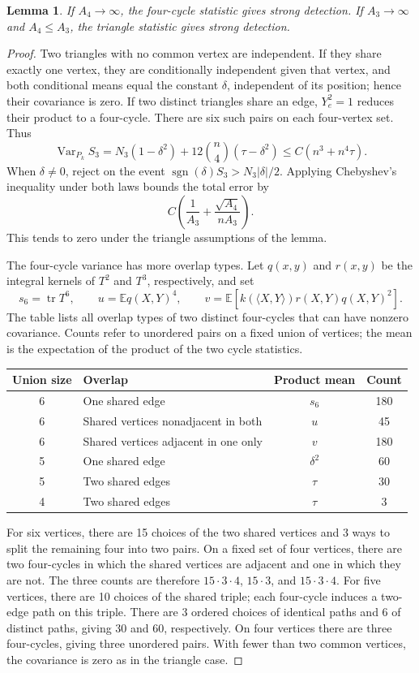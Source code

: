 \documentclass[11pt,reqno]{amsart}
\numberwithin{equation}{section}
\newtheorem{lemma}[theorem]{Lemma}
\theoremstyle{definition}
\theoremstyle{remark}
\theoremstyle{definition}
\DeclareMathOperator{\tr}{tr}
\DeclareMathOperator{\Var}{Var}
\begin{document}
\begin{lemma}\label{lem:cycle-detection}
If $A_4\to\infty$, the four-cycle statistic gives strong detection.
If $A_3\to\infty$ and $A_4\le A_3$, the triangle statistic gives strong detection.
\end{lemma}
\begin{proof}
Two triangles with no common vertex are independent. If they share exactly one vertex, they are conditionally independent given that vertex,
and both conditional means equal the constant $\delta$, independent of its position; hence their covariance is zero.
If two distinct triangles share an edge, $Y_e^2=1$ reduces their product to a four-cycle.
There are six such pairs on each four-vertex set. Thus
\begin{equation}\label{eq:triangle-var}
 \Var_{P_k}S_3=N_3(1-\delta^2)
       +12\binom n4(\tau-\delta^2)
 \le C(n^3+n^4\tau).
\end{equation}
When $\delta\ne0$, reject on the event
$\operatorname{sgn}(\delta)S_3>N_3|\delta|/2$.
Applying Chebyshev's inequality under both laws bounds the total error by
\[
 C\left(\frac1{A_3}+\frac{\sqrt{A_4}}{nA_3}\right).
\]
This tends to zero under the triangle assumptions of the lemma.

The four-cycle variance has more overlap types. Let $q(x,y)$ and $r(x,y)$ be the integral kernels of $T^2$ and $T^3$, respectively, and set
\[
 s_6=\tr T^6,\qquad u=\mathbb E q(X,Y)^4,\qquad
 v=\mathbb E[k(\langle X,Y\rangle)r(X,Y)q(X,Y)^2].
\]
The table lists all overlap types of two distinct four-cycles that can have nonzero covariance.
Counts refer to unordered pairs on a fixed union of vertices; the mean is the expectation of the product of the two cycle statistics.
\begin{center}
\begin{tabular}{clcc}
\toprule
Union size&Overlap&Product mean&Count\\
\midrule
6&One shared edge&$s_6$&180\\
6&Shared vertices nonadjacent in both&$u$&45\\
6&Shared vertices adjacent in one only&$v$&180\\
5&One shared edge&$\delta^2$&60\\
5&Two shared edges&$\tau$&30\\
4&Two shared edges&$\tau$&3\\
\bottomrule
\end{tabular}
\end{center}
For six vertices, there are 15 choices of the two shared vertices and 3 ways to split the remaining four into two pairs.
On a fixed set of four vertices, there are two four-cycles in which the shared vertices are adjacent and one in which they are not.
The three counts are therefore $15\cdot3\cdot4$, $15\cdot3$, and $15\cdot3\cdot4$.
For five vertices, there are 10 choices of the shared triple; each four-cycle induces a two-edge path on this triple.
There are 3 ordered choices of identical paths and 6 of distinct paths, giving 30 and 60, respectively.
On four vertices there are three four-cycles, giving three unordered pairs.
With fewer than two common vertices, the covariance is zero as in the triangle case.


\end{proof}
\end{document}
